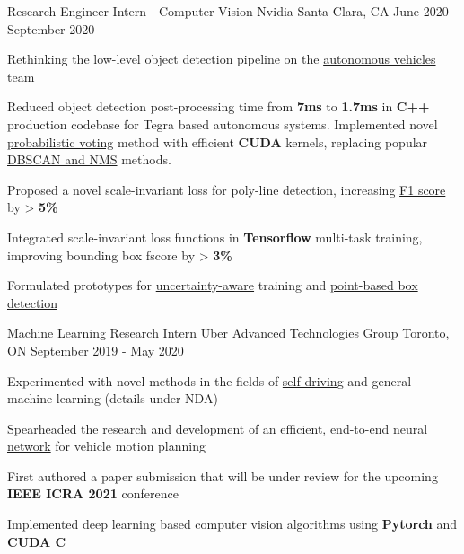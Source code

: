 
\begin{cventries}
  \cventry
    {Research Engineer Intern - Computer Vision} %
    {Nvidia} %
    {Santa Clara, CA} %
    {June 2020 - September 2020} %
    {
      \begin{cvitems} %
        \item {Rethinking the low-level object detection pipeline on the \underline{autonomous vehicles} team}
        \item {Reduced object detection post-processing time from \textbf{7ms} to \textbf{1.7ms} in \textbf{C++} production codebase for Tegra based autonomous systems. Implemented novel \underline{probabilistic voting} method with efficient \textbf{CUDA} kernels, replacing popular \underline{DBSCAN and NMS} methods.}
        \item {Proposed a novel scale-invariant loss for poly-line detection, increasing \underline{F1 score} by > \textbf{5\%}}
        \item {Integrated scale-invariant loss functions in \textbf{Tensorflow} multi-task training, improving bounding box fscore by > \textbf{3\%}}
        \item {Formulated prototypes for \underline{uncertainty-aware} training and \underline{point-based box detection}}
      \end{cvitems}
    }

  \cventry
    {Machine Learning Research Intern} %
    {Uber Advanced Technologies Group} %
    {Toronto, ON} %
    {September 2019 - May 2020} %
    {
      \begin{cvitems} %
        \item {Experimented with novel methods in the fields of \underline{self-driving} and general machine learning (details under NDA)}
        \item {Spearheaded the research and development of an efficient, end-to-end \underline{neural network} for vehicle motion planning}
        \item {First authored a paper submission that will be under review for the upcoming \textbf{IEEE ICRA 2021} conference}
        \item {Implemented deep learning based computer vision algorithms using \textbf{Pytorch} and \textbf{CUDA C}}
      \end{cvitems}
    }


\end{cventries}
